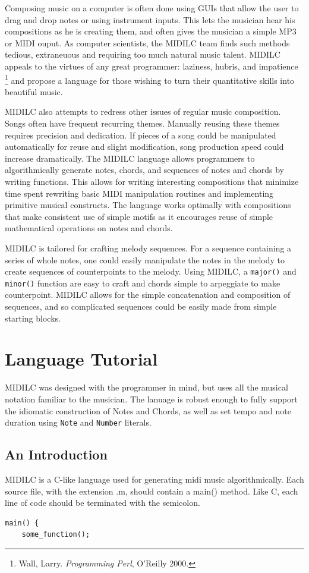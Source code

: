 \documentclass[12pt,A4]{book}
\begin{document}
Composing music on a computer is often done using GUIs that allow the user to drag and drop notes or using instrument inputs. This lets the musician hear his compositions as he is creating them, and often gives the musician a simple MP3 or MIDI ouput. As computer scientists, the MIDILC team finds such methods tedious, extraneuous and requiring too much natural music talent. MIDILC appeals to the virtues of any great programmer: laziness, hubris, and impatience \footnote{Wall, Larry. \textit{Programming Perl}, O'Reilly 2000.} and propose a language for those wishing to turn their quantitative skills into beautiful music.

MIDILC also attempts to redress other issues of regular music composition. Songs often have frequent recurring themes. Manually reusing these themes requires precision and dedication. If pieces of a song could be manipulated automatically for reuse and slight modification, song production speed could increase dramatically. The MIDILC language allows programmers to algorithmically generate notes, chords, and sequences of notes and chords by writing functions. This allows for writing interesting compositions that minimize time spent rewriting basic MIDI manipulation routines and implementing primitive musical constructs. The language works optimally with compositions that make consistent use of simple motifs as it encourages reuse of simple mathematical operations on notes and chords. 

MIDILC is tailored for crafting melody sequences. For a sequence containing a series of whole notes, one could easily manipulate the notes in the melody to create sequences of counterpoints to the melody. Using MIDILC, a \verb|major()| and \verb|minor()| function are easy to craft and chords simple to arpeggiate to make counterpoint. MIDILC allows for the simple concatenation and composition of sequences, and so complicated sequences could be easily made from simple starting blocks.

\chapter{Language Tutorial}
MIDILC was designed with the programmer in mind, but uses all the musical notation familiar to the musician. The lanuage is robust enough to fully support the idiomatic construction of Notes and Chords, as well as set tempo and note duration using \verb|Note| and \verb|Number| literals.
\section{An Introduction}
MIDILC is a C-like language used for generating midi music algorithmically. Each source file, with the extension .m, should contain a main() method. Like C, each line of code should be terminated with the semicolon.
\begin{verbatim}
main() {
    some_function();
\end{verbatim}
\end{document}
